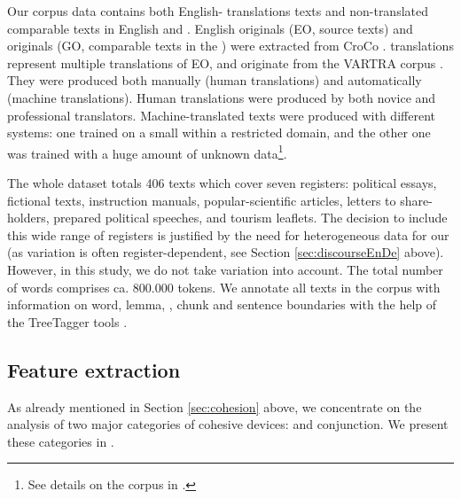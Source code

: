 \documentclass[output=paper]{langsci/langscibook.cls}
\begin{document}
Our corpus  data contains both English- translations texts and non-trans\-lat\-ed comparable texts in English and . English originals (EO, source texts) and  originals (GO, comparable texts in the ) were extracted from CroCo \citep{Croco2012}.  translations represent multiple translations of EO, and originate from the VARTRA corpus \citep{LapshinovaKoltunski:2013:BUCC}. They were produced both manually (human translations) and automatically (machine translations). Human translations were produced by both novice and professional translators. Machine-translated texts were produced with different systems: one trained on a small  within a restricted domain, and the other one was trained with a huge amount of unknown data\footnote{See details on the corpus in \citet{LapshinovaKoltunski:2013:BUCC}.}.

The whole dataset totals 406 texts which cover seven registers: political essays, fictional texts, instruction manuals, popular-scientific articles, letters to share-holders, prepared political speeches, and tourism leaflets. The decision to include this wide range of registers is justified by the need for heterogeneous data for our  (as variation is often register-dependent, see Section \ref{sec:discourseEnDe} above). However, in this study, we do not take  variation into account. The total number of words comprises ca. 800.000 tokens. We annotate all texts in the corpus with information on word, lemma, , chunk and sentence boundaries with the help of the TreeTagger tools \citep{Schmid1994}.

\largerpage
\subsection{Feature extraction}\label{sec:features}
As already mentioned in Section \ref{sec:cohesion} above, we concentrate on the analysis of two major categories of cohesive devices:  and conjunction. We present these categories in .
\end{document}
